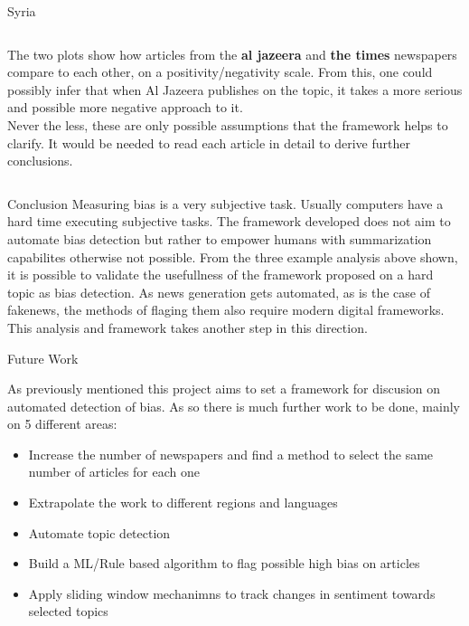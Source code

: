\documentclass[final]{beamer}
\newlength{\twocolwid}
\begin{document}
\begin{frame}[t]
\begin{columns}[t]
\begin{column}{\twocolwid}
\begin{block}{Syria}
\begin{columns}
        \begin{column}{.55\textwidth}
            The two plots show how articles from the \textbf{al jazeera} and \textbf{the times} newspapers compare to each other, on a positivity/negativity scale.
            From this, one could possibly infer that when Al Jazeera publishes on the topic, it takes a more serious and possible more negative approach to it.\\
            Never the less, these are only possible assumptions that the framework helps to clarify. It would be needed to read each article in detail to derive further conclusions.
        \end{column}
    \end{columns}
\end{block}


\begin{block}{Conclusion}
    Measuring bias is a very subjective task. 
    Usually computers have a hard time executing subjective tasks. 
    The framework developed does not aim to automate bias detection but 
    rather to empower humans with summarization capabilites otherwise not possible.
    From the three example analysis above shown, it is possible to validate the usefullness of the framework proposed on a hard topic as bias detection.
    As news generation gets automated, as is the case of fakenews, the methods of flaging them also require modern digital frameworks.
    This analysis and framework takes another step in this direction.

\end{block}


\begin{block}{Future Work}

    As previously mentioned this project aims to set a framework for discusion on automated detection of bias. 
    As so there is much further work to be done, mainly on 5 different areas:

    \begin{itemize}
        \item Increase the number of newspapers and find a method to select the same number of articles for each one
        \item Extrapolate the work to different regions and languages
        \item Automate topic detection 
        \item Build a ML/Rule based algorithm to flag possible high bias on articles
        \item Apply sliding window mechanimns to track changes in sentiment towards selected topics
    \end{itemize}


\end{block}
\end{column}
\end{columns}
\end{frame}
\end{document}
